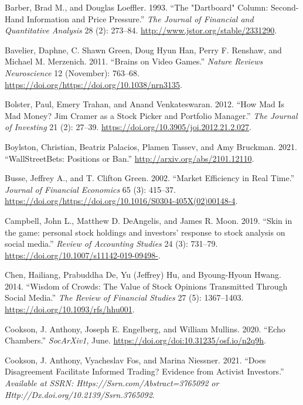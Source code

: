 \documentclass[12pt,]{article}
\begin{document}
\leavevmode\hypertarget{ref-barber1993}{}%
Barber, Brad M., and Douglas Loeffler. 1993. ``The "Dartboard" Column:
Second-Hand Information and Price Pressure.'' \emph{The Journal of
Financial and Quantitative Analysis} 28 (2): 273--84.
\url{http://www.jstor.org/stable/2331290}.

\leavevmode\hypertarget{ref-bavelier2011}{}%
Bavelier, Daphne, C. Shawn Green, Doug Hyun Han, Perry F. Renshaw, and
Michael M. Merzenich. 2011. ``Brains on Video Games.'' \emph{Nature
Reviews Neuroscience} 12 (November): 763--68.
\url{https://doi.org/https://doi.org/10.1038/nrn3135}.

\leavevmode\hypertarget{ref-bolster2012}{}%
Bolster, Paul, Emery Trahan, and Anand Venkateswaran. 2012. ``How Mad Is
Mad Money? Jim Cramer as a Stock Picker and Portfolio Manager.''
\emph{The Journal of Investing} 21 (2): 27--39.
\url{https://doi.org/10.3905/joi.2012.21.2.027}.

\leavevmode\hypertarget{ref-boylston2021}{}%
Boylston, Christian, Beatriz Palacios, Plamen Tassev, and Amy Bruckman.
2021. ``WallStreetBets: Positions or Ban.''
\url{http://arxiv.org/abs/2101.12110}.

\leavevmode\hypertarget{ref-busse2002}{}%
Busse, Jeffrey A., and T. Clifton Green. 2002. ``Market Efficiency in
Real Time.'' \emph{Journal of Financial Economics} 65 (3): 415--37.
\url{https://doi.org/https://doi.org/10.1016/S0304-405X(02)00148-4}.

\leavevmode\hypertarget{ref-campbell2019}{}%
Campbell, John L., Matthew D. DeAngelis, and James R. Moon. 2019. ``Skin
in the game: personal stock holdings and investors' response to stock
analysis on social media.'' \emph{Review of Accounting Studies} 24 (3):
731--79. \url{https://doi.org/10.1007/s11142-019-09498-}.

\leavevmode\hypertarget{ref-chen2014}{}%
Chen, Hailiang, Prabuddha De, Yu (Jeffrey) Hu, and Byoung-Hyoun Hwang.
2014. ``Wisdom of Crowds: The Value of Stock Opinions Transmitted
Through Social Media.'' \emph{The Review of Financial Studies} 27 (5):
1367--1403. \url{https://doi.org/10.1093/rfs/hhu001}.

\leavevmode\hypertarget{ref-cookson2020}{}%
Cookson, J. Anthony, Joseph E. Engelberg, and William Mullins. 2020.
``Echo Chambers.'' \emph{SocArXiv1}, June.
\url{https://doi.org/doi:10.31235/osf.io/n2q9h}.

\leavevmode\hypertarget{ref-cookson2021}{}%
Cookson, J. Anthony, Vyacheslav Fos, and Marina Niessner. 2021. ``Does
Disagreement Facilitate Informed Trading? Evidence from Activist
Investors.'' \emph{Available at SSRN: Https://Ssrn.com/Abstract=3765092
or Http://Dx.doi.org/10.2139/Ssrn.3765092}.
\end{document}
